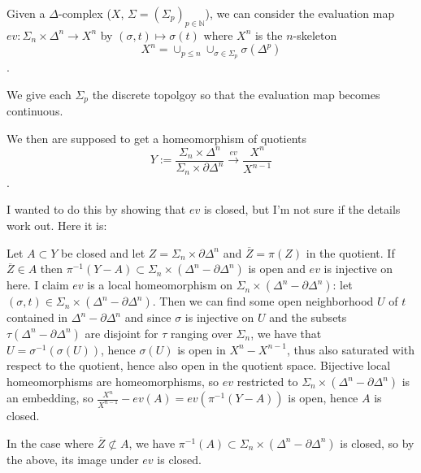 \documentclass[reqno]{amsart}
\theoremstyle{definition}
\theoremstyle{remark}
\begin{document}
    Given a $\Delta$-complex ($X$, $\Sigma = (\Sigma_p)_{p \in \mathbb{N}}$), we can consider the evaluation map $ev \colon \Sigma_n \times \Delta^n \to X^n$ by
$(\sigma,t) \mapsto \sigma(t)$ where $X^n$ is the $n$-skeleton
$$ X^n = \cup_{p \leq n} \cup_{\sigma \in \Sigma_p} \sigma(\Delta^p) $$.

We give each $\Sigma_p$ the discrete topolgoy so that the evaluation map becomes continuous.

We then are supposed to get a homeomorphism of quotients
$$ Y:= \frac{\Sigma_n \times \Delta^n}{\Sigma_n \times \partial \Delta^n} 
\stackrel{ev}{\to} \frac{X^n}{X^{n-1}}$$.

I wanted to do this by showing that $ev$ is closed, but I'm not sure if the details work out. Here it is:

Let $A \subset Y$ be closed and let $Z = \Sigma_n \times \partial \Delta^n$ and
$\overline{Z} = \pi (Z)$ in the quotient. If $\overline{Z} \in A$ then $\pi^{-1}(Y-A)
\subset \Sigma_n \times (\Delta^n - \partial \Delta^n)$ is open and $ev$ is injective on here. I claim $ev$ is a local homeomorphism on $\Sigma_n \times (\Delta^n - \partial \Delta^n)$: let $(\sigma, t) \in \Sigma_n \times (\Delta^n - \partial \Delta^n)$. Then
we can find some open neighborhood $U$ of $t$ contained in $\Delta^n - \partial \Delta^n$ and since $\sigma$ is injective on $U$ and the subsets $\tau (\Delta^n - \partial \Delta^n)$ are disjoint for $\tau$ ranging over $\Sigma_n$, we have that $U = \sigma^{-1} (\sigma(U))$, hence $\sigma(U)$ is open in $X^n - X^{n-1}$, thus also saturated with respect to the quotient, hence also open in the quotient space. Bijective local homeomorphisms are homeomorphisms, so $ev$ restricted to
$\Sigma_n \times (\Delta^n - \partial \Delta^n)$ is an embedding, so $\frac{X^n}{X^{n-1}} - ev(A) = ev (\pi^{-1}(Y-A))$ is open, hence $A$ is closed.

In the case where $\overline{Z} \not \subset A$, we have $\pi^{-1}(A) \subset \Sigma_n \times (\Delta^n - \partial \Delta^n)$ is closed, so by the above, its image under $ev$ is closed.
\end{document}
